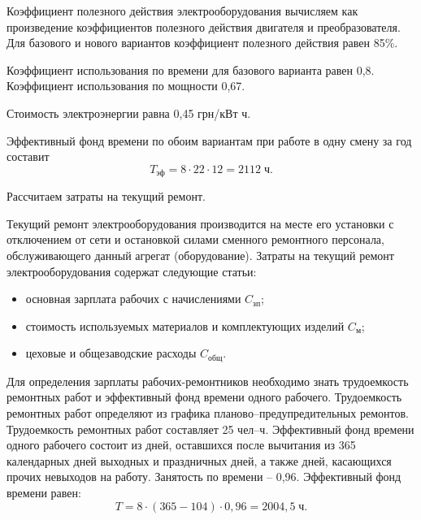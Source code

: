         Коэффициент полезного действия электрооборудования вычисляем как
        произведение коэффициентов полезного действия двигателя и
        преобразователя.  Для базового и нового вариантов коэффициент полезного
        действия равен 85\%.

        Коэффициент использования по времени для базового варианта равен 0,8.
        Коэффициент использования по мощности 0,67.

        Стоимость электроэнергии равна 0,45 грн/кВт ч.

        Эффективный фонд времени по обоим вариантам при работе в одну смену за
        год составит
        \begin{equation}
            T_\text{эф} = 8 \cdot 22 \cdot 12 = 2112 \; \text{ч}. 
        \end{equation}

        Рассчитаем затраты на текущий ремонт.

        Текущий ремонт электрооборудования производится на месте его установки
        с отключением от сети и остановкой силами сменного ремонтного
        персонала, обслуживающего данный агрегат (оборудование).  Затраты на
        текущий ремонт электрооборудования содержат следующие статьи:

        \begin{itemize}
            \item основная зарплата рабочих с начислениями $C_\text{зп}$;
            \item стоимость используемых материалов и комплектующих изделий
                $C_\text{м}$;
            \item цеховые и общезаводские расходы $C_\text{общ}$.
        \end{itemize}

        Для определения зарплаты рабочих-ремонтников необходимо знать
        трудоемкость ремонтных работ и эффективный фонд времени одного
        рабочего.  Трудоемкость ремонтных работ определяют из графика
        планово–предупредительных ремонтов.  Трудоемкость ремонтных работ
        составляет 25 чел–ч.  Эффективный фонд времени одного рабочего состоит
        из дней, оставшихся после вычитания из 365 календарных дней выходных и
        праздничных дней, а также дней, касающихся прочих невыходов на работу.
        Занятость по времени – 0,96. Эффективный фонд времени равен:
        \begin{equation}
            T = 8 \cdot (365 - 104) \cdot 0,96 = 2004,5 \; \text{ч}. 
        \end{equation}

